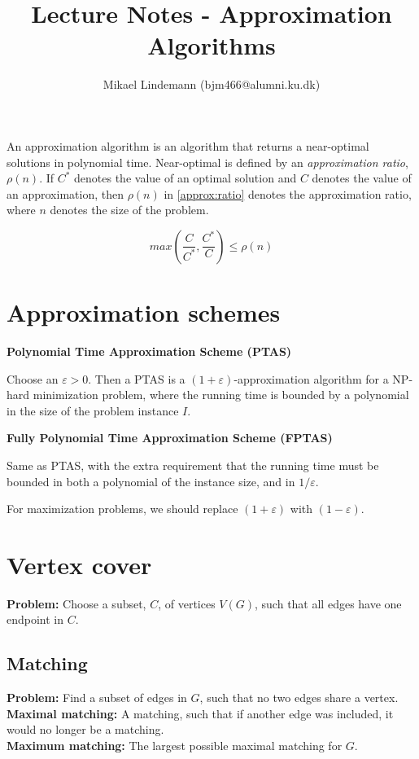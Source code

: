 \documentclass[a4paper]{article}
\author{Mikael Lindemann (bjm466@alumni.ku.dk)}
\title{Lecture Notes - Approximation Algorithms}
\newcommand{\newpar}{\bigskip\noindent}
\begin{document}
	\maketitle
	\noindent An approximation algorithm is an algorithm that returns a near-optimal solutions in polynomial time. Near-optimal is defined by an \textit{approximation ratio}, $\rho(n)$. If $C^*$ denotes the value of an optimal solution and $C$ denotes the value of an approximation, then $\rho(n)$ in \autoref{approx:ratio} denotes the approximation ratio, where $n$ denotes the size of the problem.
	
	\begin{equation}\label{approx:ratio}
		max\left(\frac{C}{C^*}, \frac{C^*}{C}\right) \leq \rho(n)
	\end{equation}
	
	\section{Approximation schemes}
	\textbf{Polynomial Time Approximation Scheme (PTAS)}
	
	\noindent Choose an $\varepsilon > 0$. Then a PTAS is a $(1+\varepsilon)$-approximation algorithm for a NP-hard minimization problem, where the running time is bounded by a polynomial in the size of the problem instance $I$.
	
	\newpar \textbf{Fully Polynomial Time Approximation Scheme (FPTAS)}
	
	\noindent Same as PTAS, with the extra requirement that the running time must be bounded in both a polynomial of the instance size, and in $1/\varepsilon$.
	
	\newpar For maximization problems, we should replace $(1+\varepsilon)$ with $(1-\varepsilon)$.
	
	\section{Vertex cover}
	\textbf{Problem:} Choose a subset, $C$, of vertices $V(G)$, such that all edges have one endpoint in $C$.
	
	\subsection{Matching}
	\textbf{Problem:} Find a subset of edges in $G$, such that no two edges share a vertex.\\
	\textbf{Maximal matching:} A matching, such that if another edge was included, it would no longer be a matching.\\
	\textbf{Maximum matching:} The largest possible maximal matching for $G$.
	
\end{document}
